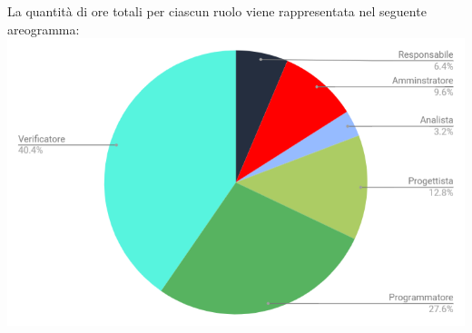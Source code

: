 \vskip 30pt %
La quantità di ore totali per ciascun ruolo viene rappresentata nel seguente areogramma:\\
\includegraphics[width=1\textwidth]{./src/Preventivo/src/img/TortaValidazione.png}
